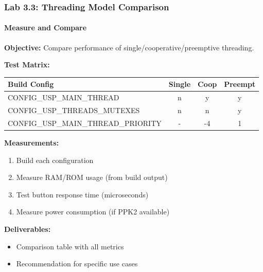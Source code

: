 \documentclass{beamer}
\begin{document}
\begin{frame}
\frametitle{Lab 3.3: Threading Model Comparison}
\framesubtitle{Measure and Compare}

\textbf{Objective:} Compare performance of single/cooperative/preemptive threading.

\textbf{Test Matrix:}
\begin{table}
\tiny
\begin{tabular}{|l|c|c|c|}
\hline
\textbf{Build Config} & \textbf{Single} & \textbf{Coop} & \textbf{Preempt} \\
\hline
CONFIG\_USP\_MAIN\_THREAD & n & y & y \\
CONFIG\_USP\_THREADS\_MUTEXES & n & n & y \\
CONFIG\_USP\_MAIN\_THREAD\_PRIORITY & - & -4 & 1 \\
\hline
\end{tabular}
\end{table}

\textbf{Measurements:}
\begin{enumerate}
    \item Build each configuration
    \item Measure RAM/ROM usage (from build output)
    \item Test button response time (microseconds)
    \item Measure power consumption (if PPK2 available)
\end{enumerate}

\textbf{Deliverables:}
\begin{itemize}
    \item Comparison table with all metrics
    \item Recommendation for specific use cases
\end{itemize}
\end{frame}
\end{document}

